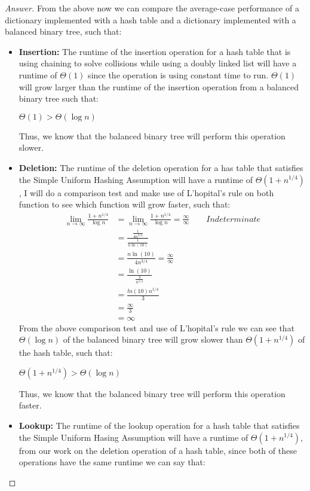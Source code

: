\documentclass[11pt]{article}
\theoremstyle{definition}
\theoremstyle{definition}
\theoremstyle{definition}
\begin{document}
\begin{enumerate}[label=(\alph*)]
\begin{proof}[Answer]
        From the above now we can compare the average-case performance of a dictionary implemented with a hash table and a dictionary implemented with a balanced binary tree, such that: \\
        \begin{itemize}
        \item \textbf{Insertion:} The runtime of the insertion operation for a hash table that is using chaining to solve collisions while using a doubly linked list will have a runtime of $\Theta(1)$ since the operation is using constant time to run. $\Theta(1)$ will grow larger than the runtime of the insertion operation from a balanced binary tree such that: \\
\begin{center}
$\Theta(1) > \Theta(\log n)$
\end{center}
Thus, we know that the balanced binary tree will perform this operation slower.
\item \textbf{Deletion:} The runtime of the deletion operation for a has table that satisfies the Simple Uniform Hashing Assumption will have a runtime of $\Theta(1+ n^{1/4})$ , I will do a comparison test and make use of L'hopital's rule on both function to see which function will grow faster, such that: \\
\begin{align*}
\lim_{n \to \infty} \frac{1 + n^{1/4}}{\log n} &= \lim_{n \to \infty} \frac{1 + n^{1/4}}{\log n} = \frac{\infty}{\infty} \qquad Indeterminate \\
&= \frac{\frac{1}{4n^{3/4}}}{\frac{1}{n\ln(10)}} \\
&= \frac{n\ln(10)}{4n^{3/4}} = \frac{\infty}{\infty} \qquad \\
&= \frac{\ln(10)}{\frac{3}{n^{1/4}}} \\
& = \frac{ln(10) n^{1/4}}{3}\\
&= \frac{\infty}{3} \\
&= \infty
\end{align*}
From the above comparison test and use of L'hopital's rule we can see that $\Theta(\log n)$  of the balanced binary tree will grow slower than $\Theta(1+ n^{1/4})$ of the hash table, such that: \\
\begin{center}
$\Theta(1+n^{1/4}) > \Theta(\log n)$ \\
\end{center}
Thus, we know that the balanced binary tree will perform this operation faster.
\item \textbf{Lookup:} The runtime of the lookup operation for a hash table that satisfies the Simple Uniform Hasing Assumption will have a runtime of $\Theta(1+n^{1/4})$, from our work on the deletion operation of a hash table, since both of these operations have the same runtime we can say that: \\

\end{itemize}
\end{proof}
\end{enumerate}
\end{document}
